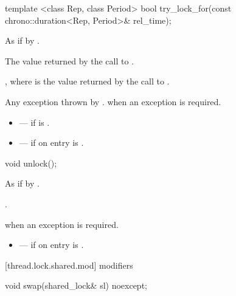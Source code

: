 %
\begin{itemdecl}
template <class Rep, class Period>
  bool try_lock_for(const chrono::duration<Rep, Period>& rel_time);
\end{itemdecl}

\begin{itemdescr}
\pnum
\effects As if by .

\pnum
\returns The value returned by the call to .

\pnum
\postconditions {}, where  is the value returned by the call to .

\pnum
\throws Any exception thrown by .  when an exception is required.

\pnum
\errors
\begin{itemize}
\item {} --- if  is .
\item {} --- if on entry  is
.
\end{itemize}
\end{itemdescr}

%
\begin{itemdecl}
void unlock();
\end{itemdecl}

\begin{itemdescr}
\pnum
\effects As if by .

\pnum
\postconditions {}.

\pnum
\throws {} when an exception is required.

\pnum
\errors
\begin{itemize}
\item {} --- if on entry  is
.
\end{itemize}
\end{itemdescr}

[thread.lock.shared.mod]{ modifiers}

%
\begin{itemdecl}
void swap(shared_lock& sl) noexcept;
\end{itemdecl}

